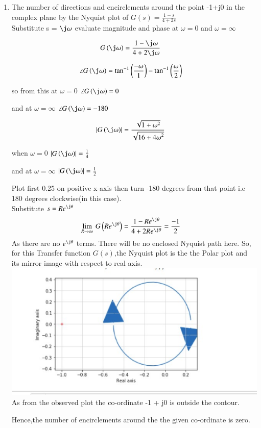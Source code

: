 \begin{enumerate}[label=\thesection.\arabic*.,ref=\thesection.\theenumi]
\item The number of directions and encirclements around the point -1+j0 in the complex plane by the Nyquist plot of $G(s) = \frac{1-s}{4+2s}$\\

\solution
Substitute s = $\j\omega$ evaluate magnitude and phase at $\omega = 0$ and $\omega = \infty$

\begin{align}
G\brak{\j\omega} &= \frac{1-\j\omega}{4+2\j\omega} 
\end{align}


\begin{align}
\angle G\brak{\j\omega} &= \tan^{-1}\brak{\frac{-\omega}{1}} - \tan^{-1}\brak{\frac{\omega}{2}}
\end{align}

so from this  at $\omega = 0$ $\angle G\brak{\j\omega} = 0$ 

and at $\omega = \infty$ $\angle G\brak{\j\omega}  =-180$  

\begin{align}
\abs{G\brak{\j\omega}} &= \frac{\sqrt{1+{\omega}^2}}{\sqrt{16+{4\omega}^2}} 
\end{align}

when $\omega = 0$ $\abs{G\brak{\j\omega}} = \frac{1}{4}$ 

and at  $\omega = \infty$ $\abs{G\brak{\j\omega}} = \frac{1}{2}$

Plot first 0.25 on positive x-axis then turn {-180} degrees from that point i.e {180} degrees clockwise(in this case).\\
Substitute $s = Re^{\j\theta}$
\begin{align}
\lim_{R\to \infty}\,G\brak{Re^{\j\theta}} &= \frac{1-Re^{\j\theta}}{4+2Re^{\j\theta}}=\frac{-1}{2}  
\end{align}
As there are no $e^{\j\theta}$ terms.
There will be no enclosed Nyquist path here.
So, for this Transfer function $G(s)$,the Nyquist plot is the the Polar plot and its mirror image with respect to real axis.
\includegraphics[width=\columnwidth]{./figs/pythonnyquistplot.eps}
As from the observed plot the co-ordinate -1 + j0 is outside the contour.

Hence,the number of encirclements around the the given co-ordinate is zero.
\end{enumerate}
